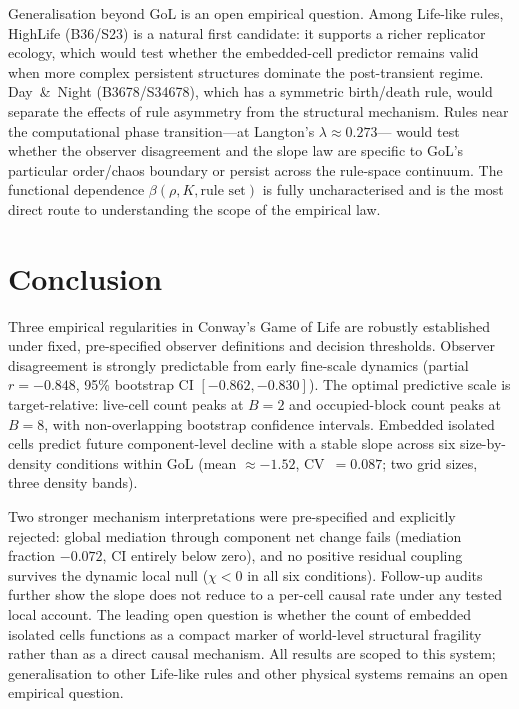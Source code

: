 \documentclass[aip,cha,preprint,nofootinbib]{revtex4-2}
\begin{document}
Generalisation beyond GoL is an open empirical question.
Among Life-like rules, HighLife (B36/S23) is a natural first candidate:
it supports a richer replicator ecology, which would test whether the
embedded-cell predictor remains valid when more complex persistent structures
dominate the post-transient regime.
Day~\&~Night (B3678/S34678), which has a symmetric birth/death rule, would
separate the effects of rule asymmetry from the structural mechanism.
Rules near the computational phase transition---at Langton's $\lambda\approx0.273$---
would test whether the observer disagreement and the slope law are specific to
GoL's particular order/chaos boundary or persist across the rule-space continuum.
The functional dependence $\beta(\rho,K,\text{rule set})$ is fully uncharacterised
and is the most direct route to understanding the scope of the empirical law.

\section{Conclusion}
\label{sec:conc}

Three empirical regularities in Conway's Game of Life are robustly
established under fixed, pre-specified observer definitions and decision
thresholds.
Observer disagreement is strongly predictable from early fine-scale dynamics
(partial $r=-0.848$, 95\% bootstrap CI $[-0.862,-0.830]$).
The optimal predictive scale is target-relative: live-cell count peaks at
$B=2$ and occupied-block count peaks at $B=8$, with non-overlapping
bootstrap confidence intervals.
Embedded isolated cells predict future component-level decline with a stable
slope across six size-by-density conditions within GoL
(mean $\approx-1.52$, CV~$=0.087$; two grid sizes, three density bands).

Two stronger mechanism interpretations were pre-specified and explicitly
rejected: global mediation through component net change fails (mediation
fraction $-0.072$, CI entirely below zero), and no positive residual
coupling survives the dynamic local null ($\chi<0$ in all six conditions).
Follow-up audits further show the slope does not reduce to a per-cell causal
rate under any tested local account.
The leading open question is whether the count of embedded isolated cells
functions as a compact marker of world-level structural fragility rather than
as a direct causal mechanism.
All results are scoped to this system; generalisation to other Life-like rules
and other physical systems remains an open empirical question.
\end{document}
